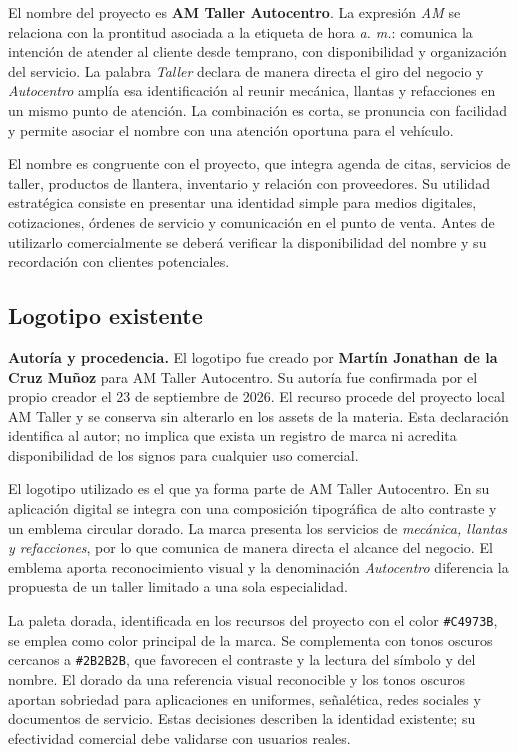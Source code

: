 {El nombre del proyecto es \textbf{AM Taller Autocentro}. La expresión \textit{AM} se relaciona con la prontitud asociada a la etiqueta de hora \textit{a. m.}: comunica la intención de atender al cliente desde temprano, con disponibilidad y organización del servicio. La palabra \textit{Taller} declara de manera directa el giro del negocio y \textit{Autocentro} amplía esa identificación al reunir mecánica, llantas y refacciones en un mismo punto de atención. La combinación es corta, se pronuncia con facilidad y permite asociar el nombre con una atención oportuna para el vehículo.

El nombre es congruente con el proyecto, que integra agenda de citas, servicios de taller, productos de llantera, inventario y relación con proveedores. Su utilidad estratégica consiste en presentar una identidad simple para medios digitales, cotizaciones, órdenes de servicio y comunicación en el punto de venta. Antes de utilizarlo comercialmente se deberá verificar la disponibilidad del nombre y su recordación con clientes potenciales.

\subsection{Logotipo existente}

\textbf{Autoría y procedencia.} El logotipo fue creado por \textbf{Martín Jonathan de la Cruz Muñoz} para AM Taller Autocentro. Su autoría fue confirmada por el propio creador el 23 de septiembre de 2026. El recurso procede del proyecto local AM Taller y se conserva sin alterarlo en los assets de la materia. Esta declaración identifica al autor; no implica que exista un registro de marca ni acredita disponibilidad de los signos para cualquier uso comercial.

El logotipo utilizado es el que ya forma parte de AM Taller Autocentro. En su aplicación digital se integra con una composición tipográfica de alto contraste y un emblema circular dorado. La marca presenta los servicios de \textit{mecánica, llantas y refacciones}, por lo que comunica de manera directa el alcance del negocio. El emblema aporta reconocimiento visual y la denominación \textit{Autocentro} diferencia la propuesta de un taller limitado a una sola especialidad.

La paleta dorada, identificada en los recursos del proyecto con el color \texttt{\#C4973B}, se emplea como color principal de la marca. Se complementa con tonos oscuros cercanos a \texttt{\#2B2B2B}, que favorecen el contraste y la lectura del símbolo y del nombre. El dorado da una referencia visual reconocible y los tonos oscuros aportan sobriedad para aplicaciones en uniformes, señalética, redes sociales y documentos de servicio. Estas decisiones describen la identidad existente; su efectividad comercial debe validarse con usuarios reales.

}
